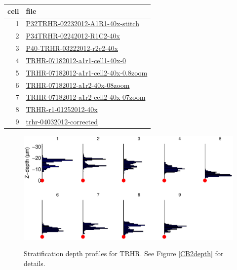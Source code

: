 \documentclass{article}
\renewenvironment{table}[1][ht]{\comment}{\endcomment}
\begin{document}
\begin{table}
  \centering
  \begin{tabular}{rl}
    \toprule
    cell & file \\
    \midrule
1& \url{P32TRHR-02232012-A1R1-40x-stitch} \\
2& \url{P34TRHR-02242012-R1C2-40x} \\
3& \url{P40-TRHR-03222012-r2c2-40x} \\
4& \url{TRHR-07182012-a1r1-cell1-40x-0} \\
5& \url{TRHR-07182012-a1r1-cell2-40x-0.8zoom} \\
6& \url{TRHR-07182012-a1r2-40x-08zoom} \\
7& \url{TRHR-07182012-a1r2-cell2-40x-07zoom} \\
8& \url{TRHR-r1-01252012-40x} \\
9& \url{trhr-04032012-corrected} \\
\bottomrule
  \end{tabular}
  \caption{List of TRHR file names in data set.}

\end{table}


\begin{figure}
  \centering
  {\includegraphics[scale=1]{Figures/SupFig2/TRHR-stratification-depth-1}}
  \caption{Stratification depth profiles for TRHR. See Figure
    \ref{CB2depth} for details.}
\end{figure}

\clearpage
\end{document}
